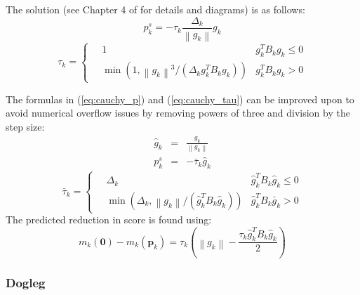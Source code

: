 \documentclass[peerreview,compsoc,onecolumn]{IEEEtran}
\newcommand{\norm}[1]{\left\lVert#1\right\rVert}
\begin{document}
The solution (see Chapter 4 of \cite{numopt2006} for details and diagrams) is as follows:
\begin{equation}
p^s_k = -\tau_k \frac{\Delta_k}{\norm{g_k}}g_k
\label{eq:cauchy_p}
\end{equation}
\begin{equation}
\tau_k = 
	\begin{cases}
		\quad 1 & g_k^T B_k g_k \le 0 \\
		\quad \min\left(1,\norm{g_k}^3/(\Delta_k g_k^T B_k g_k)\right) & g_k^T B_k g_k > 0
	\end{cases}
	\label{eq:cauchy_tau}
\end{equation}

The formulas in (\ref{eq:cauchy_p}) and (\ref{eq:cauchy_tau}) can be improved upon to avoid numerical overflow issues by removing powers of three and division by the step size:
\begin{eqnarray}
\hat{g}_k &=& \frac{g_k}{\norm{g_k}} \\
p^s_k &=& -\bar{\tau}_k \hat{g}_k
\end{eqnarray}
\begin{equation}
\bar{\tau}_k = \begin{cases}
		\quad \Delta_k & \hat{g}_k^T B_k \hat{g}_k\le 0 \\
		\quad \min\left(\Delta_k,\norm{g_k}/(\hat{g}_k^T B_k \hat{g}_k)\right) & \hat{g}_k^T B_k \bar{g}_k > 0
	\end{cases}
\end{equation}
The predicted reduction in score is found using:
\begin{equation}
m_k(\bm{0})-m_k(\bm{p}_k) = \tau_k\left(\norm{g_k} - \frac{\tau_k \hat{g}_k^T B_k \hat{g}_k}{2} \right)
\end{equation}


\subsubsection{Dogleg}
\label{section:dogleg}  
\end{document}
